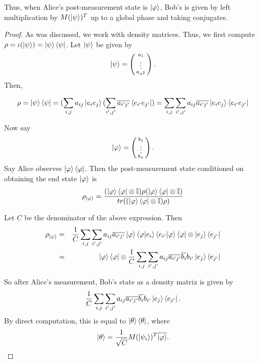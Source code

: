Thus, when Alice's post-measurement state is $\ket{\varphi}$, Bob's is given by left multiplication by $M(\ket{\psi})^T$ up to a global phase and taking conjugates.

\begin{proof}
As was discussed, we work with density matrices.  Thus, we first compute $\rho=\iota(\ket{\psi})=\ket{\psi}\bra{\psi}$.  Let $\ket{\psi}$ be given by 
\begin{equation}
\ket{\psi}=\left(\begin{smallmatrix}a_1\\ \vdots \\a_{n^2}\end{smallmatrix}\right).
\end{equation}
Then, 

\begin{equation}
\rho=\ket{\psi}\bra{\psi}=(\sum_{i,j} a_{ij}\ket{e_i e_j}(\sum_{i',j'} \overline{a_{i'j'}}\bra{e_{i'} e_{j'}})=\sum_{i,j} \sum_{i',j'} a_{ij} \overline{a_{i'j'}}\ket{e_i e_j}\bra{e_{i'} e_{j'}}   
\end{equation}

Now say
\begin{equation}
\ket{\varphi}=\left(\begin{smallmatrix}b_1\\ \vdots \\b_n\end{smallmatrix}\right).
\end{equation}
Say Alice observes $\ket{\varphi}\bra{\varphi}$.
Then the post-measurement state conditioned on obtaining the end state $\ket{\varphi}$ is
\begin{equation}
\rho_{\ket{\varphi}}=\frac{(\ket{\varphi}\bra{\varphi} \otimes \mathbb{I})\rho(\ket{\varphi}\bra{\varphi} \otimes \mathbb{I})}{tr((\ket{\varphi}\bra{\varphi} \otimes \mathbb{I})\rho)}
\end{equation}

Let $C$ be the denominator of the above expression. Then 
\begin{eqnarray}
\rho_{\ket{\varphi}}&=&\frac{1}{C} \sum_{i,j} \sum_{{i'}, {j'}} a_{ij} \overline{a_{i'j'}}\ket{\varphi}\braket{\varphi|e_i}\braket{e_{i'}|\varphi}\bra{\varphi} \otimes \ket{e_j}\bra{e_{j'}}\\
&=&\ket{\varphi}\bra{\varphi} \otimes \frac{1}{C} \sum_{i,j} \sum_{{i'}, {j'}} a_{ij} \overline{a_{i'j'}}\overline{b_i}b_{i'}\ket{e_j}\bra{e_{j'}}
\end{eqnarray}

So after Alice's measurement, Bob's state as a density matrix is given by
\begin{equation}
    \frac{1}{C} \sum_{i,j} \sum_{{i'}, {j'}} a_{ij} \overline{a_{i'j'}}\overline{b_i}b_{i'}\ket{e_j}\bra{e_{j'}}.
\end{equation}
By direct computation, this is equal to $\ket{\theta}\bra{\theta}$, where
\begin{equation}
    \ket{\theta}=\frac{1}{\sqrt{C}} M(\ket{\psi_i})^T \overline{\ket{\varphi}}.
\end{equation}


\end{proof}

